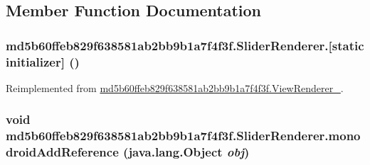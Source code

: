 \subsection{Member Function Documentation}
\hypertarget{classmd5b60ffeb829f638581ab2bb9b1a7f4f3f_1_1_slider_renderer_f81699d519e8b12712e3907d06e2b81e}{
\subsubsection[{[static initializer]}]{\setlength{\rightskip}{0pt plus 5cm}md5b60ffeb829f638581ab2bb9b1a7f4f3f.SliderRenderer.\mbox{[}static initializer\mbox{]} ()}}
\label{classmd5b60ffeb829f638581ab2bb9b1a7f4f3f_1_1_slider_renderer_f81699d519e8b12712e3907d06e2b81e}




Reimplemented from \hyperlink{classmd5b60ffeb829f638581ab2bb9b1a7f4f3f_1_1_view_renderer__2_a0898cf56fa9a49b653470eaf1608e77}{md5b60ffeb829f638581ab2bb9b1a7f4f3f.ViewRenderer\_}.\hypertarget{classmd5b60ffeb829f638581ab2bb9b1a7f4f3f_1_1_slider_renderer_52c4922dec0b09c2a4d75e7488624539}{
\subsubsection[{monodroidAddReference}]{\setlength{\rightskip}{0pt plus 5cm}void md5b60ffeb829f638581ab2bb9b1a7f4f3f.SliderRenderer.monodroidAddReference (java.lang.Object {\em obj})}}
\label{classmd5b60ffeb829f638581ab2bb9b1a7f4f3f_1_1_slider_renderer_52c4922dec0b09c2a4d75e7488624539}




